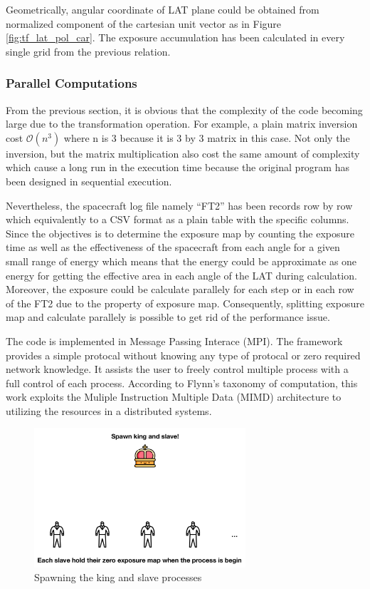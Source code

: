 Geometrically, angular coordinate of LAT plane could be obtained from
normalized component of the cartesian unit vector as in Figure
\ref{fig:tf_lat_pol_car}. The exposure accumulation has been
calculated in every single grid from the previous relation.

\subsubsection{Parallel Computations}

From the previous section, it is obvious that the complexity of 
the code becoming large due to the transformation operation.
For example, a plain matrix inversion cost $\mathcal{O}(n^3)$ where 
n is 3 because it is 3 by 3 matrix in this case. Not only the inversion,
but the matrix multiplication also cost the same amount of
complexity which cause a long run in the execution time because 
the original program has been designed in sequential execution.

Nevertheless, the spacecraft log file namely ``FT2'' has been records
row by row which equivalently to a CSV format as a plain table with 
the specific columns. Since the objectives is to determine the exposure map
by counting the exposure time as well as the effectiveness of the spacecraft 
from each angle for a given small range of energy which means that 
the energy could be approximate as one energy for getting the effective 
area in each angle of the LAT during calculation. Moreover, the exposure 
could be calculate parallely for each step or in each row of the FT2 due to 
the property of exposure map. Consequently, splitting exposure map 
and calculate parallely is possible to get rid of the performance issue.

The code is implemented
in Message Passing Interace (MPI). The framework provides 
a simple protocal without knowing any type of protocal or 
zero required network knowledge. It assists the user to 
freely control multiple process with a full control of 
each process. According to Flynn's taxonomy of computation,
this work exploits the Muliple Instruction Multiple Data (MIMD)
architecture to utilizing the resources in a distributed systems.

\begin{figure}[h!]
    \centering
    \includegraphics[width=0.7\textwidth]{content/methodology/figures/ms1}
    \caption{Spawning the king and slave processes}
    \label{fig:ms1}
\end{figure}

